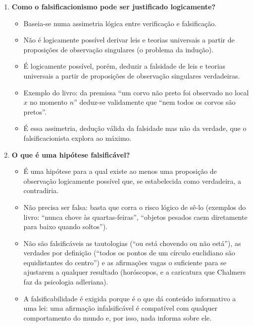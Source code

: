 \documentclass[10pt,a4paper]{extarticle}
\begin{document}
\begin{enumerate}[label=\textbf{\arabic*.}, itemsep=10pt]
\item \textbf{Como o falsificacionismo pode ser justificado logicamente?}
\begin{itemize}
  \item Baseia-se numa assimetria lógica entre verificação e falsificação.
  \item Não é logicamente possível derivar leis e teorias universais a partir de proposições de observação singulares (o problema da indução).
  \item É logicamente possível, porém, deduzir a falsidade de leis e teorias universais a partir de proposições de observação singulares verdadeiras.
  \item Exemplo do livro: da premissa \enquote{um corvo não preto foi observado no local $x$ no momento $n$} deduz-se validamente que \enquote{nem todos os corvos são pretos}.
  \item É essa assimetria, dedução válida da falsidade mas não da verdade, que o falsificacionista explora ao máximo.
\end{itemize}

\item \textbf{O que é uma hipótese falsificável?}
\begin{itemize}
  \item É uma hipótese para a qual existe ao menos uma proposição de observação logicamente possível que, se estabelecida como verdadeira, a contradiria.
  \item Não precisa ser falsa: basta que corra o risco lógico de sê-lo (exemplos do livro: \enquote{nunca chove às quartas-feiras}, \enquote{objetos pesados caem diretamente para baixo quando soltos}).
  \item Não são falsificáveis as tautologias (\enquote{ou está chovendo ou não está}), as verdades por definição (\enquote{todos os pontos de um círculo euclidiano são equidistantes do centro}) e as afirmações vagas o suficiente para se ajustarem a qualquer resultado (horóscopos, e a caricatura que Chalmers faz da psicologia adleriana).
  \item A falsificabilidade é exigida porque é o que dá conteúdo informativo a uma lei: uma afirmação infalsificável é compatível com qualquer comportamento do mundo e, por isso, nada informa sobre ele.
\end{itemize}


\end{enumerate}
\end{document}
